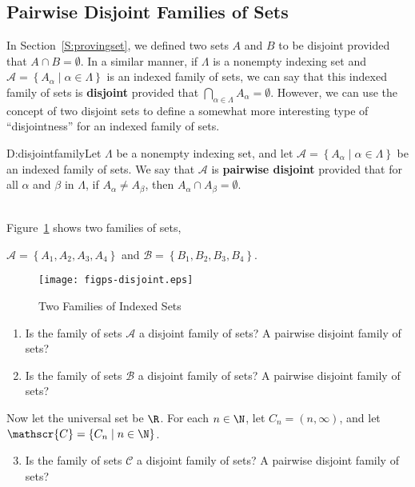 \subsection*{Pairwise Disjoint Families of Sets}
In Section~\ref{S:provingset}, we defined two sets $A$ and $B$ to be disjoint provided that 
$A \cap B = \emptyset$.  
In a similar manner, if 
$\Lambda$ is a nonempty indexing set and 
$\mathscr{A} = \left\{ A_\alpha \mid \alpha \in \Lambda \right\}$ is an indexed family of sets, we can say that this indexed family of sets is \textbf{disjoint} provided that 
$\bigcap\limits_{\alpha \in \Lambda}^{}A_\alpha = \emptyset$.  However, we can use the concept of two disjoint sets to define a somewhat more interesting type of ``disjointness'' for an indexed family of sets.

\begin{defbox}{D:disjointfamily}{Let $\Lambda$ be a nonempty indexing set, and let 
$\mathscr{A} = \left\{ A_\alpha \mid \alpha \in \Lambda \right\}$ be an indexed family of sets.  We say that $\mathscr{A}$ is \textbf{pairwise disjoint} 
%
provided that for all 
$\alpha$ and $\beta$ in $\Lambda$, if $A_\alpha \ne A_\beta$, then 
$A_\alpha \cap A_\beta = \emptyset$.}
\end{defbox}

\begin{prog} \label{prog:disjoint} \hfill \\
Figure~\ref{fig:disjoint} shows two families of sets, 
\begin{center}
$\mathscr{A} = \left\{A_1, A_2, A_3, A_4 \right\}$ and 
$\mathscr{B} = \left\{B_1, B_2, B_3, B_4 \right\}$.
\end{center}

\begin{figure}[h]
\begin{center}
\texttt{[image: figps-disjoint.eps]}
\end{center}
\caption{Two Families of Indexed Sets} \label{fig:disjoint}
\end{figure}
\begin{enumerate}
\item Is the family of sets $\mathscr{A}$ a disjoint family of sets?  A pairwise disjoint family of sets?
\item Is the family of sets $\mathscr{B}$ a disjoint family of sets?  A pairwise disjoint family of sets?
\end{enumerate}

\noindent
Now let the universal set be $\R$. For each $n \in \N$, let $C_n = \left( n, \infty \right)$, and  let \linebreak
$\mathscr{C} = \left\{ C_n \mid n \in \N \right\}$. 

\begin{enumerate} \setcounter{enumi}{2}
\item Is the family of sets $\mathscr{C}$ a disjoint family of sets?  A pairwise disjoint family of sets?
\end{enumerate}
\end{prog}
\hbreak

\endinput
